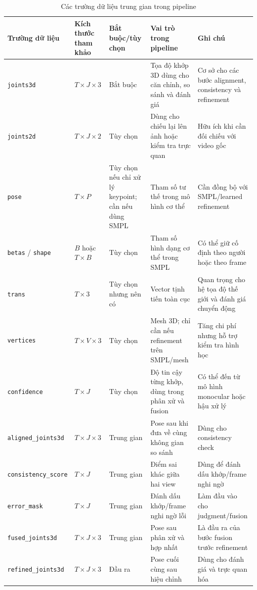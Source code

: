 \documentclass[../DoAn.tex]{subfiles}
\begin{document}
\begin{table}[H]
\centering
\caption{Các trường dữ liệu trung gian trong pipeline}
\label{tab:data_format}
\small
\begin{tabular}{|p{3.0cm}|p{2.3cm}|p{2.4cm}|p{3.2cm}|p{4.2cm}|}
\hline
\textbf{Trường dữ liệu} & \textbf{Kích thước tham khảo} & \textbf{Bắt buộc/tùy chọn} & \textbf{Vai trò trong pipeline} & \textbf{Ghi chú} \\
\hline
\texttt{joints3d} & $T \times J \times 3$ & Bắt buộc & Tọa độ khớp 3D dùng cho căn chỉnh, so sánh và đánh giá & Cơ sở cho các bước alignment, consistency và refinement \\
\hline
\texttt{joints2d} & $T \times J \times 2$ & Tùy chọn & Dùng cho chiếu lại lên ảnh hoặc kiểm tra trực quan & Hữu ích khi cần đối chiếu với video gốc \\
\hline
\texttt{pose} & $T \times P$ & Tùy chọn nếu chỉ xử lý keypoint; cần nếu dùng SMPL & Tham số tư thế trong mô hình cơ thể & Cần đồng bộ với SMPL/learned refinement \\
\hline
\texttt{betas} / \texttt{shape} & $B$ hoặc $T \times B$ & Tùy chọn & Tham số hình dạng cơ thể trong SMPL & Có thể giữ cố định theo người hoặc theo frame \\
\hline
\texttt{trans} & $T \times 3$ & Tùy chọn nhưng nên có & Vector tịnh tiến toàn cục & Quan trọng cho hệ tọa độ thế giới và đánh giá chuyển động \\
\hline
\texttt{vertices} & $T \times V \times 3$ & Tùy chọn & Mesh 3D; chỉ cần nếu refinement trên SMPL/mesh & Tăng chi phí nhưng hỗ trợ kiểm tra hình học \\
\hline
\texttt{confidence} & $T \times J$ & Tùy chọn & Độ tin cậy từng khớp, dùng trong phân xử và fusion & Có thể đến từ mô hình monocular hoặc hậu xử lý \\
\hline
\texttt{aligned\_joints3d} & $T \times J \times 3$ & Trung gian & Pose sau khi đưa về cùng không gian so sánh & Dùng cho consistency check \\
\hline
\texttt{consistency\_score} & $T \times J$ & Trung gian & Điểm sai khác giữa hai view & Dùng để đánh dấu khớp/frame nghi ngờ \\
\hline
\texttt{error\_mask} & $T \times J$ & Trung gian & Đánh dấu khớp/frame nghi ngờ lỗi & Làm đầu vào cho judgment/fusion \\
\hline
\texttt{fused\_joints3d} & $T \times J \times 3$ & Trung gian & Pose sau phân xử và hợp nhất & Là đầu ra của bước fusion trước refinement \\
\hline
\texttt{refined\_joints3d} & $T \times J \times 3$ & Đầu ra & Pose cuối cùng sau hiệu chỉnh & Dùng cho đánh giá và trực quan hóa \\
\hline
\end{tabular}
\end{table}
\end{document}
